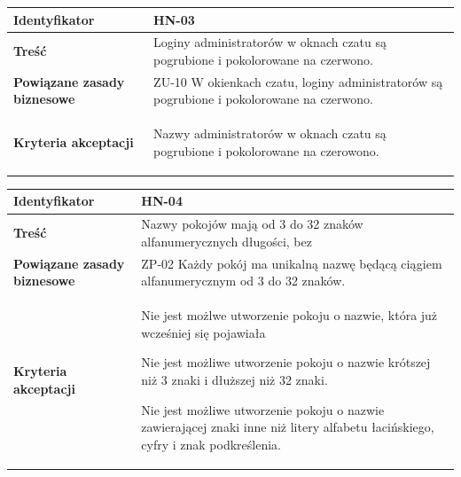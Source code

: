 \vspace{2em}

\begin{tabular}{ | l | l | }
	\hline
		\textbf{Identyfikator} &
		HN-03
		\\

	\hline
		\textbf{Treść} & \parbox[t]{13cm}{
			Loginy administratorów w oknach czatu są pogrubione i pokolorowane na czerwono.
		}\\

	\hline
		\parbox[t]{4cm}{\textbf{Powiązane zasady biznesowe}} & \parbox[t]{13cm}{
			ZU-10 W okienkach czatu, loginy administratorów są pogrubione i pokolorowane na czerwono.
		}\\

	\hline
		\parbox[t]{4cm}{\textbf{Kryteria akceptacji}} & \parbox[t]{13cm}{
			\begin{enumreq}
				\item Nazwy administratorów w oknach czatu są pogrubione
        i pokolorowane na czerowono.
			\end{enumreq}
			}
		\\

	\hline
\end{tabular}

\vspace{2em}

\begin{tabular}{ | l | l | }
	\hline
		\textbf{Identyfikator} &
		HN-04
		\\

	\hline
		\textbf{Treść} & \parbox[t]{13cm}{
			Nazwy pokojów mają od 3 do 32 znaków alfanumerycznych długości, bez
		}\\

	\hline
		\parbox[t]{4cm}{\textbf{Powiązane zasady biznesowe}} & \parbox[t]{13cm}{
			ZP-02 Każdy pokój ma unikalną nazwę będącą ciągiem
      alfanumerycznym od 3 do 32 znaków.
		}\\

	\hline
		\parbox[t]{4cm}{\textbf{Kryteria akceptacji}} & \parbox[t]{13cm}{
			\begin{enumreq}
				\item Nie jest możlwe utworzenie pokoju o nazwie, która
        już wcześniej się pojawiała
        \item Nie jest możliwe utworzenie pokoju o nazwie krótszej niż 3 znaki i dłuższej niż 32 znaki.
        \item Nie jest możliwe utworzenie pokoju o nazwie zawierającej znaki inne niż litery alfabetu łacińskiego, cyfry i znak podkreślenia.
			\end{enumreq}
			}
		\\

	\hline
\end{tabular}

